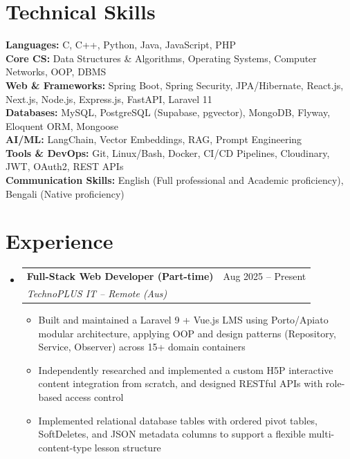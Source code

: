 \documentclass[letterpaper,10.5pt]{article}
\makeatletter
\newcommand{\resumeItem}[1]{%
  \item\small{#1}\par\vspace{-2pt}%
}
\newcommand{\resumeSubheading}[4]{
  \vspace{-2pt}\item
    \begin{tabular*}{\textwidth}[t]{l@{\extracolsep{\fill}}r}
      \textbf{#1} & #2 \\
      \textit{\small#3} & \textit{\small #4} \\
    \end{tabular*}\vspace{-7pt}
}
\newcommand{\resumeSubHeadingListStart}{\begin{itemize}[leftmargin=0.0in, label={}]}
\newcommand{\resumeSubHeadingListEnd}{\end{itemize}}
\newcommand{\resumeItemListStart}{\begin{itemize}[leftmargin=0.15in]}
\newcommand{\resumeItemListEnd}{\end{itemize}\vspace{-5pt}}
\makeatother
\begin{document}
\section{Technical Skills}
 \begin{itemize}[leftmargin=0.0in, label={}]
    \small{\item{
     \textbf{Languages:} C, C++, Python, Java, JavaScript, PHP \\[1pt]
     \textbf{Core CS:} Data Structures \& Algorithms, Operating Systems, Computer Networks, OOP, DBMS \\[1pt]
     \textbf{Web \& Frameworks:} Spring Boot, Spring Security, JPA/Hibernate, React.js, Next.js, Node.js, Express.js, FastAPI, Laravel 11 \\[1pt]
     \textbf{Databases:} MySQL, PostgreSQL (Supabase, pgvector), MongoDB, Flyway, Eloquent ORM, Mongoose \\[1pt]
     \textbf{AI/ML:} LangChain, Vector Embeddings, RAG, Prompt Engineering \\[1pt]
     \textbf{Tools \& DevOps:} Git, Linux/Bash, Docker, CI/CD Pipelines, Cloudinary, JWT, OAuth2, REST APIs \\[1pt]
     \textbf{Communication Skills:} English (Full professional and Academic proficiency), Bengali (Native proficiency)
    }}
 \end{itemize}
\vspace{-8pt}

\section{Experience}
  \resumeSubHeadingListStart
    \resumeSubheading
      {Full-Stack Web Developer (Part-time)}{Aug 2025 -- Present}
      {TechnoPLUS IT -- Remote (Aus)}{}
      \resumeItemListStart
        \resumeItem{Built and maintained a Laravel 9 + Vue.js LMS using Porto/Apiato modular architecture, applying OOP and design patterns (Repository, Service, Observer) across 15+ domain containers}
        \resumeItem{Independently researched and implemented a custom H5P interactive content integration from scratch, and designed RESTful APIs with role-based access control}
        \resumeItem{Implemented relational database tables with ordered pivot tables, SoftDeletes, and JSON metadata columns to support a flexible multi-content-type lesson structure}
      \resumeItemListEnd
  \resumeSubHeadingListEnd
\vspace{-8pt}

\end{document}
